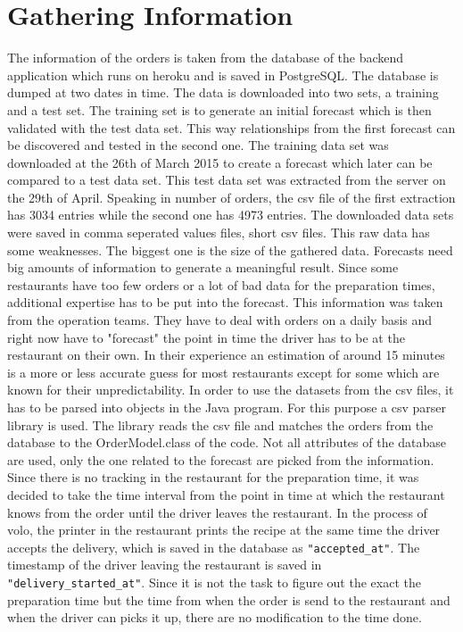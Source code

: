 \section{Gathering Information}\label{section:Gathering Information}
The information of the orders is taken from the database of the backend application which runs on heroku and is saved in PostgreSQL. The database is dumped at two dates in time. The data is downloaded into two sets, a training and a test set. The training set is to generate an initial forecast which is then validated with the test data set. This way relationships from the first forecast can be discovered and tested in the second one. The training data set was downloaded at the 26th of March 2015 to create a forecast which later can be compared to a test data set. This test data set was extracted from the server on the 29th of April. Speaking in number of orders, the csv file of the first extraction has 3034 entries while the second one has 4973 entries. The downloaded data sets were saved in comma seperated values files, short csv files.\newline
This raw data has some weaknesses. The biggest one is the size of the gathered data. Forecasts need big amounts of information to generate a meaningful result. Since some restaurants have too few orders or a lot of bad data for the preparation times, additional expertise has to be put into the forecast. This information was taken from the operation teams. They have to deal with orders on a daily basis and right now have to "forecast" the point in time the driver has to be at the restaurant on their own. In their experience an estimation of around 15 minutes is a more or less accurate guess for most restaurants except for some which are known for their unpredictability.\newline
In order to use the datasets from the csv files, it has to be parsed into objects in the Java program. For this purpose a csv parser library is used. The library reads the csv file and matches the orders from the database to the OrderModel.class of the code. Not all attributes of the database are used, only the one related to the forecast are picked from the information. Since there is no tracking in the restaurant for the preparation time, it was decided to take the time interval from the point in time at which the restaurant knows from the order until the driver leaves the restaurant. In the process of volo, the printer in the restaurant prints the recipe at the same time the driver accepts the delivery, which is saved in the database as \texttt{"accepted\_at"}. The timestamp of the driver leaving the restaurant is saved in \texttt{"delivery\_started\_at"}. Since it is not the task to figure out the exact the preparation time but the time from when the order is send to the restaurant and when the driver can picks it up, there are no modification to the time done.
